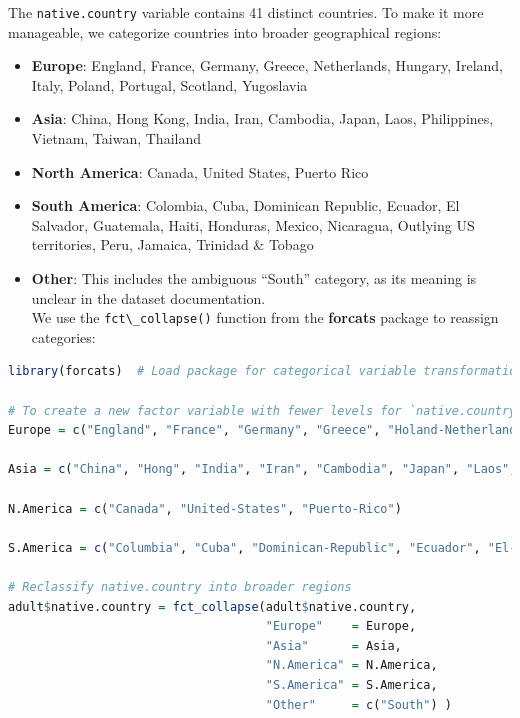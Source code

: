 \documentclass[
]{book}
\newcommand{\passthrough}[1]{#1}
\providecommand{\tightlist}{%
  \setlength{\itemsep}{0pt}\setlength{\parskip}{0pt}}
\theoremstyle{definition}
\theoremstyle{definition}
\theoremstyle{definition}
\theoremstyle{definition}
\theoremstyle{remark}
\begin{document}
The \passthrough{\lstinline!native.country!} variable contains 41 distinct countries. To make it more manageable, we categorize countries into broader geographical regions:

\begin{itemize}
\tightlist
\item
  \textbf{Europe}: England, France, Germany, Greece, Netherlands, Hungary, Ireland, Italy, Poland, Portugal, Scotland, Yugoslavia\\
\item
  \textbf{Asia}: China, Hong Kong, India, Iran, Cambodia, Japan, Laos, Philippines, Vietnam, Taiwan, Thailand\\
\item
  \textbf{North America}: Canada, United States, Puerto Rico\\
\item
  \textbf{South America}: Colombia, Cuba, Dominican Republic, Ecuador, El Salvador, Guatemala, Haiti, Honduras, Mexico, Nicaragua, Outlying US territories, Peru, Jamaica, Trinidad \& Tobago\\
\item
  \textbf{Other}: This includes the ambiguous ``South'' category, as its meaning is unclear in the dataset documentation.\\
  We use the \passthrough{\lstinline!fct\_collapse()!} function from the \textbf{forcats} package to reassign categories:
\end{itemize}

\begin{lstlisting}[language=R]
library(forcats)  # Load package for categorical variable transformation

# To create a new factor variable with fewer levels for `native.country`
Europe = c("England", "France", "Germany", "Greece", "Holand-Netherlands", "Hungary", "Ireland", "Italy", "Poland", "Portugal", "Scotland", "Yugoslavia")

Asia = c("China", "Hong", "India", "Iran", "Cambodia", "Japan", "Laos", "Philippines", "Vietnam", "Taiwan", "Thailand")

N.America = c("Canada", "United-States", "Puerto-Rico")

S.America = c("Columbia", "Cuba", "Dominican-Republic", "Ecuador", "El-Salvador", "Guatemala", "Haiti", "Honduras", "Mexico", "Nicaragua", "Outlying-US(Guam-USVI-etc)", "Peru", "Jamaica", "Trinadad&Tobago")

# Reclassify native.country into broader regions
adult$native.country = fct_collapse(adult$native.country, 
                                    "Europe"    = Europe,
                                    "Asia"      = Asia,
                                    "N.America" = N.America,
                                    "S.America" = S.America,
                                    "Other"     = c("South") )
\end{lstlisting}
\end{document}

